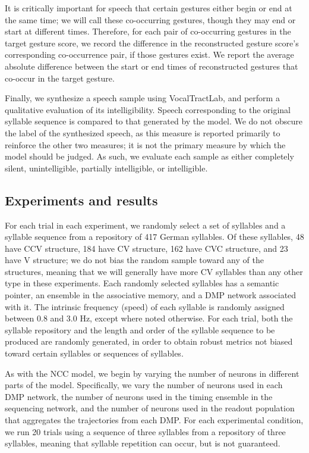 It is critically important
for speech that certain gestures
either begin or end at the same time;
we will call these co-occurring gestures,
though they may end or start at different times.
Therefore, for each pair
of co-occurring gestures in the
target gesture score,
we record the difference
in the reconstructed gesture score's
corresponding co-occurrence pair,
if those gestures exist.
We report the average absolute
difference between the start or end times
of reconstructed gestures
that co-occur in the target gesture.

Finally, we synthesize a speech sample
using VocalTractLab,
and perform a qualitative evaluation
of its intelligibility.
Speech corresponding to the
original syllable sequence is compared
to that generated by the model.
We do not obscure the label
of the synthesized speech,
as this measure is reported primarily
to reinforce the other two measures;
it is not the primary measure
by which the model should be judged.
As such, we evaluate each sample
as either completely silent,
unintelligible, partially intelligible,
or intelligible.

\subsection{Experiments and results}

For each trial in each experiment,
we randomly select a set of syllables
and a syllable sequence
from a repository of 417 German syllables.
Of these syllables,
48 have CCV structure,
184 have CV structure,
162 have CVC structure,
and 23 have V structure;
we do not bias the random sample
toward any of the structures,
meaning that we will generally
have more CV syllables
than any other type in these experiments.
Each randomly selected syllables
has a semantic pointer,
an ensemble in the associative memory,
and a DMP network associated with it.
The intrinsic frequency (speed)
of each syllable is randomly assigned
between 0.8 and 3.0 Hz,
except where noted otherwise.
For each trial,
both the syllable repository
and the length and order
of the syllable sequence
to be produced are randomly generated,
in order to obtain robust metrics
not biased toward certain syllables
or sequences of syllables.

As with the NCC model,
we begin by varying the number of neurons
in different parts of the model.
Specifically, we vary the number of neurons
used in each DMP network,
the number of neurons used in the
timing ensemble in the sequencing network,
and the number of neurons used
in the readout population that
aggregates the trajectories
from each DMP.
For each experimental condition,
we run 20 trials using
a sequence of three syllables
from a repository of three syllables,
meaning that syllable repetition can occur,
but is not guaranteed.

